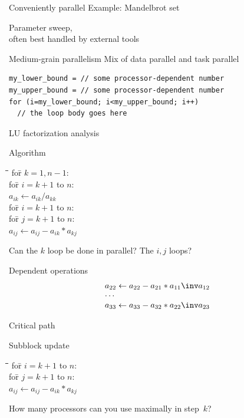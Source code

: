 \begin{numberedframe}{Conveniently parallel}
  Example: Mandelbrot set

  Parameter sweep,\\
  often best handled by external tools
\end{numberedframe}

\begin{numberedframe}{Medium-grain parallelism}
Mix of data parallel and task parallel
\begin{lstlisting}
my_lower_bound = // some processor-dependent number
my_upper_bound = // some processor-dependent number
for (i=my_lower_bound; i<my_upper_bound; i++)
  // the loop body goes here
\end{lstlisting}
\end{numberedframe}

 {LU factorization analysis}

\begin{numberedframe}{Algorithm}
  \begin{tabbing}
    \kern10pt\=\kern10pt\=\kern10pt\=\kill
    for\={} $k=1,n-1$:\\
    \>for\={} $i=k+1$ to $n$:\\
    \>\> $a_{ik}\leftarrow a_{ik}/a_{kk}$\\
    \>for\={} $i=k+1$ to $n$:\\
    \>\>for\={} $j=k+1$ to $n$:\\
    \>\>\>$a_{ij}\leftarrow a_{ij}-a_{ik}*a_{kj}$
  \end{tabbing}

  Can the $k$ loop be done in parallel? The $i,j$ loops?
\end{numberedframe}

\begin{numberedframe}{Dependent operations}
\[ 
\begin{array}{l}
  a_{22} \leftarrow a_{22} - a_{21}*a_{11}\inv a_{12}\\
  \cdots\\
  a_{33} \leftarrow a_{33} - a_{32}*a_{22}\inv a_{23}\\
\end{array}
\]
\end{numberedframe}

\begin{exerciseframe}{Critical path}
  
\end{exerciseframe}

\begin{numberedframe}{Subblock update}
\begin{tabbing}
  \kern20pt\=\kern10pt\=\kern10pt\=\kern10pt\=\kill
  for\={} $i=k+1$ to $n$:\\
  \>for\={} $j=k+1$ to $n$:\\
  \>\>$a_{ij}\leftarrow a_{ij}-a_{ik}*a_{kj}$
\end{tabbing}
  
How many processors can you use maximally in step~$k$?
\end{numberedframe}

